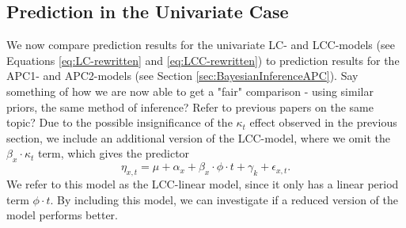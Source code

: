 

\subsection{Prediction in the Univariate Case}
We now compare prediction results for the univariate LC- and LCC-models (see Equations \ref{eq:LC-rewritten} and \ref{eq:LCC-rewritten}) to prediction results for the APC1- and APC2-models (see Section \ref{sec:BayesianInferenceAPC}).
\textcolor{myDarkGreen}{Say something of how we are now able to get a "fair" comparison - using similar priors, the same method of inference? Refer to previous papers on the same topic? }
Due to the possible insignificance of the $\kappa_t$ effect observed in the previous section, we include an additional version of the LCC-model, where we omit the $\beta_x\cdot \kappa_t$ term, which gives the predictor
\begin{equation}
    \eta_{x,t} = \mu + \alpha_x + \beta_x\cdot \phi \cdot t + \gamma_k + \epsilon_{x,t}.
\end{equation}
We refer to this model as the LCC-linear model, since it only has a linear period term $\phi \cdot t$. By including this model, we can investigate if a reduced version of the model performs better. 

